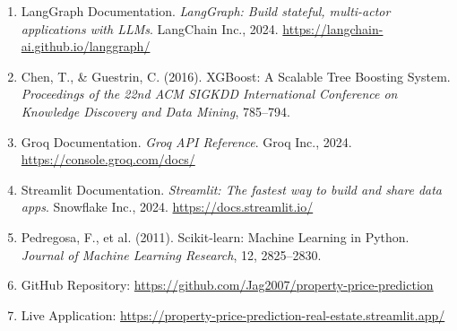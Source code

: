 \documentclass[12pt,a4paper]{article}
\begin{document}
\begin{enumerate}[leftmargin=1.5em]
  \item LangGraph Documentation. \textit{LangGraph: Build stateful, multi-actor applications with LLMs}. LangChain Inc., 2024. \url{https://langchain-ai.github.io/langgraph/}
  \item Chen, T., \& Guestrin, C. (2016). XGBoost: A Scalable Tree Boosting System. \textit{Proceedings of the 22nd ACM SIGKDD International Conference on Knowledge Discovery and Data Mining}, 785--794.
  \item Groq Documentation. \textit{Groq API Reference}. Groq Inc., 2024. \url{https://console.groq.com/docs/}
  \item Streamlit Documentation. \textit{Streamlit: The fastest way to build and share data apps}. Snowflake Inc., 2024. \url{https://docs.streamlit.io/}
  \item Pedregosa, F., et al. (2011). Scikit-learn: Machine Learning in Python. \textit{Journal of Machine Learning Research}, 12, 2825--2830.
  \item GitHub Repository: \url{https://github.com/Jag2007/property-price-prediction}
  \item Live Application: \url{https://property-price-prediction-real-estate.streamlit.app/}
\end{enumerate}
\end{document}
